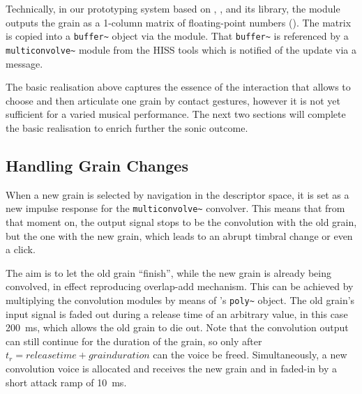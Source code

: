 Technically, in our prototyping system based on ,  , and its   library, the  module outputs the grain as a 1-column matrix of floating-point numbers ().  The matrix is copied into a \verb|buffer~| object via the  module.
That \verb|buffer~| is referenced by a \verb|multiconvolve~| module from the HISS tools which is notified of the update via a message.


The basic realisation above captures the essence of the interaction that allows to choose and then articulate one grain by contact gestures, however it is not yet sufficient for a varied musical performance.  The next two sections will complete the basic realisation to enrich further the sonic outcome.


\subsection{Handling Grain Changes}\label{sec:set}

When a new grain is selected by navigation in the descriptor space, it is set as a new impulse response for the \verb|multiconvolve~| convolver.  This means that from that moment on, the output signal stops to be the convolution with the old grain, but the one with the new grain, which leads to an abrupt timbral change or even a click.

The aim is to let the old grain ``finish'', while the new grain is already being convolved, in effect reproducing overlap-add mechanism.  This can be achieved by multiplying the convolution modules by means of \maxmsp's \verb|poly~| object.  The old grain's input signal is faded out during a release time of an arbitrary value, in this case 200~ms, which allows the old grain to die out.  Note that the convolution output can still continue for the duration of the grain, so only after $t_r = release time + grain duration$ can the voice be freed.  Simultaneously, a new convolution voice is allocated and receives the new grain and in faded-in by a short attack ramp of 10~ms.

